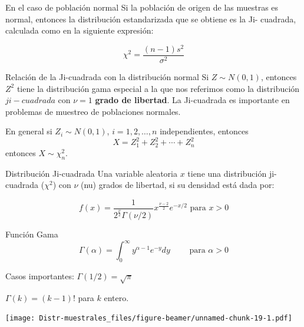 \documentclass[
  10pt,
  ignorenonframetext,
]{beamer}
\begin{document}
\begin{frame}{}
\protect\hypertarget{section-47}{}
\begin{block}{En el caso de población normal}
\protect\hypertarget{en-el-caso-de-poblaciuxf3n-normal}{}
Si la población de origen de las muestras es normal, entonces la
distribución estandarizada que se obtiene es la Ji- cuadrada, calculada
como en la siguiente expresión:

\[\chi^2=\frac{(n-1)s^2}{\sigma^2}\]
\end{block}

\begin{block}{Relación de la Ji-cuadrada con la distribución normal}
\protect\hypertarget{relaciuxf3n-de-la-ji-cuadrada-con-la-distribuciuxf3n-normal}{}
Si \(Z \sim N(0,1)\), entonces \(Z^2\) tiene la distribución gama
especial a la que nos referimos como la distribución \(ji-cuadrada\) con
\(\nu = 1\) \textbf{grado de libertad}. La Ji-cuadrada es importante en
problemas de muestreo de poblaciones normales.

En general si \(Z_i \sim N(0,1)\), \(i=1,2,\ldots,n\) independientes,
entonces \[X=Z_1^2 +Z_2^2+\cdots+Z_n^2\] entonces \(X\sim\chi_n^2\).
\end{block}
\end{frame}

\begin{frame}{}
\protect\hypertarget{section-48}{}
\begin{block}{Distribución Ji-cuadrada}
\protect\hypertarget{distribuciuxf3n-ji-cuadrada}{}
Una variable aleatoria \(x\) tiene una distribución ji-cuadrada
(\(\chi^2\)) con \(\nu\) (nu) grados de libertad, si su densidad está
dada por:

\[f(x)=\frac{1}{2^{\frac{\nu}{2}}\Gamma(\nu/2)}x^{\frac{\nu-2}{2}}e^{-x/2} \mbox{ para } x>0\]
\end{block}

\begin{block}{Función Gama}
\protect\hypertarget{funciuxf3n-gama}{}
\[\Gamma(\alpha)=\int_0^\infty y^{\alpha -1}e^{-y}dy \qquad \mbox{ para } \alpha >0\]

Casos importantes: \(\Gamma(1/2)=\sqrt{\pi}\)

\(\Gamma(k)= (k-1)!\) para \(k\) entero.
\end{block}
\end{frame}

\begin{frame}{}
\protect\hypertarget{section-49}{}
\texttt{[image: Distr-muestrales\_files/figure-beamer/unnamed-chunk-19-1.pdf]}
\end{frame}
\end{document}
